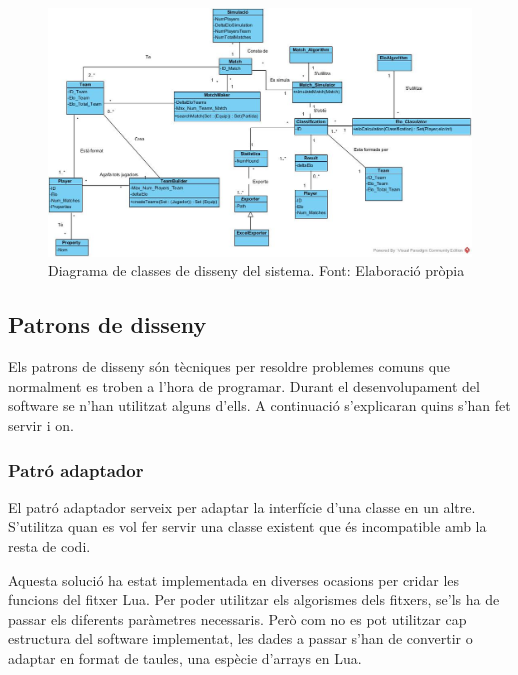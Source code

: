 \documentclass[a4paper]{article}
\begin{document}
\begin{landscape}

\newpage
\thispagestyle{lndscape}
    \begin{center}
        \begin{figure}[h!]
            \includegraphics[width=1.5 \textwidth]{images/DessignClasses2.jpg}%
            \caption{Diagrama de classes de disseny del sistema. Font: Elaboració pròpia}
            \label{fig:DessignDiagram}
        \end{figure}
    \end{center}
\end{landscape}

\subsection{Patrons de disseny}

Els patrons de disseny són tècniques per resoldre problemes comuns que normalment es troben a l'hora de programar. Durant el desenvolupament del software se n'han utilitzat alguns d'ells. A continuació s'explicaran quins s'han fet servir i on.

\subsubsection*{Patró adaptador}
El patró adaptador serveix per adaptar la interfície d'una classe en un altre. S'utilitza quan es vol fer servir una classe existent que és incompatible amb la resta de codi.

Aquesta solució ha estat implementada en diverses ocasions per cridar les funcions del fitxer Lua. Per poder utilitzar els algorismes dels fitxers, se'ls ha de passar els diferents paràmetres necessaris. Però com no es pot utilitzar cap estructura del software implementat, les dades a passar s'han de convertir o adaptar en format de taules, una espècie d'arrays en Lua.
\end{document}

